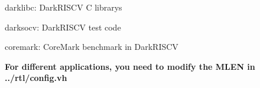 
\begin{DoxyItemize}
\item darklibc\+: Dark\+R\+I\+S\+CV C librarys
\item darksocv\+: Dark\+R\+I\+S\+CV test code
\item coremark\+: Core\+Mark benchmark in Dark\+R\+I\+S\+CV
\end{DoxyItemize}

{\bfseries{For different applications, you need to modify the M\+L\+EN in {\ttfamily ../rtl/config.vh}}} 